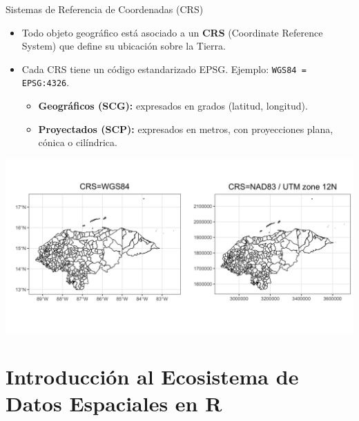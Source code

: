 \documentclass{beamer}
\begin{document}
\begin{frame}{Sistemas de Referencia de Coordenadas (CRS)}
\small
\begin{itemize}
    \item Todo objeto geográfico está asociado a un \textbf{CRS} (Coordinate Reference System) que define su ubicación sobre la Tierra.
    \item Cada CRS tiene un código estandarizado EPSG. Ejemplo: \texttt{WGS84 = EPSG:4326}.
    \begin{itemize}
        \item \textbf{Geográficos (SCG):} expresados en grados (latitud, longitud).
        \item \textbf{Proyectados (SCP):} expresados en metros, con proyecciones plana, cónica o cilíndrica.
    \end{itemize}
\end{itemize}
\vspace{-2.0em}
\centering
\includegraphics[width=1\linewidth]{figures/geographic_projected.png}
\end{frame}

\section{Introducción al Ecosistema de Datos Espaciales en R}
\begin{frame}[noframenumbering]
\tableofcontents[currentsection]
\end{frame}
\end{document}
